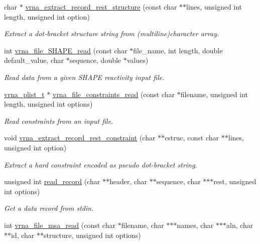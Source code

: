 \begin{DoxyCompactItemize}
char $\ast$ \hyperlink{group__file__utils_gad37cbb63a05eed63ba25c91628409be0}{vrna\+\_\+extract\+\_\+record\+\_\+rest\+\_\+structure} (const char $\ast$$\ast$lines, unsigned int length, unsigned int option)
\begin{DoxyCompactList}\small\item\em Extract a dot-\/bracket structure string from (multiline)character array. \end{DoxyCompactList}\item 
int \hyperlink{group__file__utils_ga646ebf45450a69a7f2533f9ecd283a32}{vrna\+\_\+file\+\_\+\+S\+H\+A\+P\+E\+\_\+read} (const char $\ast$file\+\_\+name, int length, double default\+\_\+value, char $\ast$sequence, double $\ast$values)
\begin{DoxyCompactList}\small\item\em Read data from a given S\+H\+A\+PE reactivity input file. \end{DoxyCompactList}\item 
\hyperlink{group__data__structures_ga8e4eb5e1bfc95776559575beb359af87}{vrna\+\_\+plist\+\_\+t} $\ast$ \hyperlink{group__file__utils_gae33323c53765ecbbc410d9de2d495432}{vrna\+\_\+file\+\_\+constraints\+\_\+read} (const char $\ast$filename, unsigned int length, unsigned int options)
\begin{DoxyCompactList}\small\item\em Read constraints from an input file. \end{DoxyCompactList}\item 
void \hyperlink{group__file__utils_ga55a9ae6dfeecc1b3f0c2acf6fa796c15}{vrna\+\_\+extract\+\_\+record\+\_\+rest\+\_\+constraint} (char $\ast$$\ast$cstruc, const char $\ast$$\ast$lines, unsigned int option)
\begin{DoxyCompactList}\small\item\em Extract a hard constraint encoded as pseudo dot-\/bracket string. \end{DoxyCompactList}\item 
unsigned int \hyperlink{group__file__utils_gafd194a69af9d92b5b0412a7627ac1595}{read\+\_\+record} (char $\ast$$\ast$header, char $\ast$$\ast$sequence, char $\ast$$\ast$$\ast$rest, unsigned int options)
\begin{DoxyCompactList}\small\item\em Get a data record from stdin. \end{DoxyCompactList}\item 
int \hyperlink{group__file__utils_gad02d5d12bda54611c915a1019323b7be}{vrna\+\_\+file\+\_\+msa\+\_\+read} (const char $\ast$filename, char $\ast$$\ast$$\ast$names, char $\ast$$\ast$$\ast$aln, char $\ast$$\ast$id, char $\ast$$\ast$structure, unsigned int options)
$$
\end{DoxyCompactItemize}
